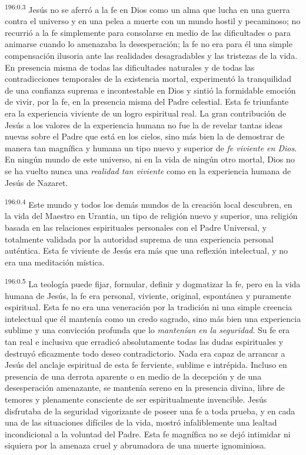 \par
\textsuperscript{196:0.3} Jesús no se aferró a la fe en Dios como un alma que lucha en una guerra contra el universo y en una pelea a muerte con un mundo hostil y pecaminoso; no recurrió a la fe simplemente para consolarse en medio de las dificultades o para animarse cuando lo amenazaba la desesperación; la fe no era para él una simple compensación ilusoria ante las realidades desagradables y las tristezas de la vida. En presencia misma de todas las dificultades naturales y de todas las contradicciones temporales de la existencia mortal, experimentó la tranquilidad de una confianza suprema e incontestable en Dios y sintió la formidable emoción de vivir, por la fe, en la presencia misma del Padre celestial. Esta fe triunfante era la experiencia viviente de un logro espiritual real. La gran contribución de Jesús a los valores de la experiencia humana no fue la de revelar tantas ideas nuevas sobre el Padre que está en los cielos, sino más bien la de demostrar de manera tan magnífica y humana un tipo nuevo y superior de \textit{fe viviente en Dios}. En ningún mundo de este universo, ni en la vida de ningún otro mortal, Dios no se ha vuelto nunca una \textit{realidad tan viviente} como en la experiencia humana de Jesús de Nazaret.

\par
\textsuperscript{196:0.4} Este mundo y todos los demás mundos de la creación local descubren, en la vida del Maestro en Urantia, un tipo de religión nuevo y superior, una religión basada en las relaciones espirituales personales con el Padre Universal, y totalmente validada por la autoridad suprema de una experiencia personal auténtica. Esta fe viviente de Jesús era más que una reflexión intelectual, y no era una meditación mística.

\par
\textsuperscript{196:0.5} La teología puede fijar, formular, definir y dogmatizar la fe, pero en la vida humana de Jesús, la fe era personal, viviente, original, espontánea y puramente espiritual. Esta fe no era una veneración por la tradición ni una simple creencia intelectual que él mantenía como un credo sagrado, sino más bien una experiencia sublime y una convicción profunda que lo \textit{mantenían en la seguridad}. Su fe era tan real e inclusiva que erradicó absolutamente todas las dudas espirituales y destruyó eficazmente todo deseo contradictorio. Nada era capaz de arrancar a Jesús del anclaje espiritual de esta fe ferviente, sublime e intrépida. Incluso en presencia de una derrota aparente o en medio de la decepción y de una desesperación amenazante, se mantenía sereno en la presencia divina, libre de temores y plenamente consciente de ser espiritualmente invencible. Jesús disfrutaba de la seguridad vigorizante de poseer una fe a toda prueba, y en cada una de las situaciones difíciles de la vida, mostró infaliblemente una lealtad incondicional a la voluntad del Padre. Esta fe magnífica no se dejó intimidar ni siquiera por la amenaza cruel y abrumadora de una muerte ignominiosa.


